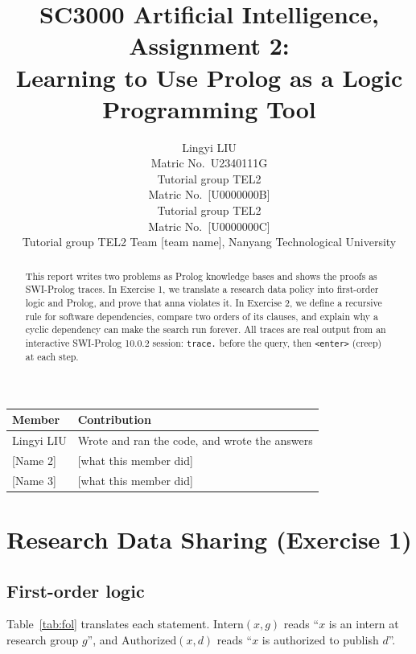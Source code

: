 \documentclass{article}
\title{SC3000 Artificial Intelligence, Assignment 2:\\ Learning to Use Prolog as a Logic Programming Tool}
\author{%
  Lingyi LIU \\ Matric No.\ U2340111G \\ Tutorial group TEL2 \And
  [Name 2] \\ Matric No.\ [U0000000B] \\ Tutorial group TEL2 \And
  [Name 3] \\ Matric No.\ [U0000000C] \\ Tutorial group TEL2 \AND
  \normalfont Team [team name], Nanyang Technological University
}
\newcommand{\p}[1]{\mathrm{#1}}   %
\begin{document}
\maketitle

\begin{abstract}
This report writes two problems as Prolog knowledge bases and shows the proofs as SWI-Prolog traces.
In Exercise 1, we translate a research data policy into first-order logic and Prolog, and prove that anna violates it.
In Exercise 2, we define a recursive rule for software dependencies, compare two orders of its clauses,
and explain why a cyclic dependency can make the search run forever.
All traces are real output from an interactive SWI-Prolog 10.0.2 session: \texttt{trace.} before the query, then \texttt{<enter>} (creep) at each step.
\end{abstract}

\begin{center}
  \begin{tabular}{ll}
    \toprule
    Member & Contribution \\
    \midrule
    Lingyi LIU & Wrote and ran the code, and wrote the answers \\
    {[Name 2]} & [what this member did] \\
    {[Name 3]} & [what this member did] \\
    \bottomrule
  \end{tabular}
\end{center}

\newpage

\section{Research Data Sharing (Exercise 1)}

\subsection{First-order logic}

Table~\ref{tab:fol} translates each statement. $\p{Intern}(x, g)$ reads ``$x$ is an intern at research group $g$'',
and $\p{Authorized}(x, d)$ reads ``$x$ is authorized to publish $d$''.
\end{document}
